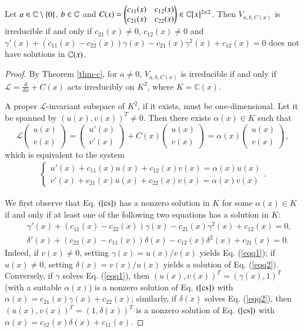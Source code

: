 \documentclass[12pt]{amsart}
\begin{document}
\begin{thm}\label{thm-rk2}Let $a\in \mathbb{C}\setminus\{0\}$, $b\in \mathbb{C}$ and $C(x)=\begin{pmatrix}
c_{11}(x)&c_{12}(x)\\
c_{21}(x)&c_{22}(x)
\end{pmatrix}\in\mathbb{C}[x]^{2\times 2}$. Then
$V_{a,b,C(x)}$ is irreducible if and only if $c_{21}(x)\neq0$, $c_{12}(x)\neq0$ and $\gamma'(x)+(c_{11}(x)-c_{22}(x))\gamma(x)-c_{21}(x)\gamma^2(x)+c_{12}(x)=0$ does not have solutions in $\mathbb{C}(x)$.
\end{thm}
\begin{proof}
By Theorem \ref{thm-c}, for $a\neq 0$, $V_{a,b,C(x)}$ is irreducible if and only if $\mathcal L=\frac{d}{dx}+C(x)$ acts irreducibly on $K^2$, where $K=\mathbb{C}(x)$.

A proper $\mathcal L$-invariant subspace of $K^2$, if it exists, must be one-dimensional. Let it be spanned by $(u(x),v(x))^T\neq 0$. Then there exists $\alpha(x)\in K$ such that $$\mathcal{L}\begin{pmatrix}u(x)\\v(x)\end{pmatrix}=\begin{pmatrix}u'(x)\\v'(x)\end{pmatrix}
+C(x)\begin{pmatrix}u(x)\\v(x)\end{pmatrix}=
\alpha(x)\begin{pmatrix}u(x)\\v(x)\end{pmatrix},$$
which is equivalent to the system
\begin{eqnarray}
\begin{cases}\label{cs}
u'(x)+c_{11}(x)u(x)+c_{12}(x)v(x)=\alpha(x)u(x)\\
v'(x)+c_{21}(x)u(x)+c_{22}(x)v(x)=\alpha(x)v(x)
\end{cases}.
\end{eqnarray}



We first observe that Eq. $(\ref{cs})$ has a nonzero solution in $K$ for some $\alpha(x)\in K$ if and only if at least one of the following two equations has a solution in $K$:
\begin{eqnarray}
&&\label{eqq1}\gamma'(x)+(c_{11}(x)-c_{22}(x))\gamma(x)-c_{21}(x)\gamma^2(x)+c_{12}(x)=0, \\
&&\label{eqq2}\delta'(x)+(c_{22}(x)-c_{11}(x))\delta(x)-c_{12}(x)\delta^2(x)+c_{21}(x)=0.
\end{eqnarray}
Indeed, if $v(x)\neq 0$, setting $\gamma(x)=u(x)/v(x)$ yields Eq. (\ref{eqq1}); if $u(x)\neq 0$, setting $\delta(x)=v(x)/u(x)$ yields a solution of Eq. (\ref{eqq2}). Conversely, if $\gamma$ solves Eq. (\ref{eqq1}), then $(u(x),v(x))^T=(\gamma(x),1)^T$ (with a suitable $\alpha(x)$) is a nonzero solution of Eq. $(\ref{cs})$ with $\alpha(x)=c_{21}(x)\gamma(x)+c_{22}(x)$; similarly, if $\delta(x)$ solves Eq. (\ref{eqq2}), then $(u(x),v(x))^T=(1,\delta(x))^T$ is a nonzero solution of Eq. $(\ref{cs})$ with $\alpha(x)=c_{12}(x)\delta(x)+c_{11}(x)$.


\end{proof}
\end{document}
